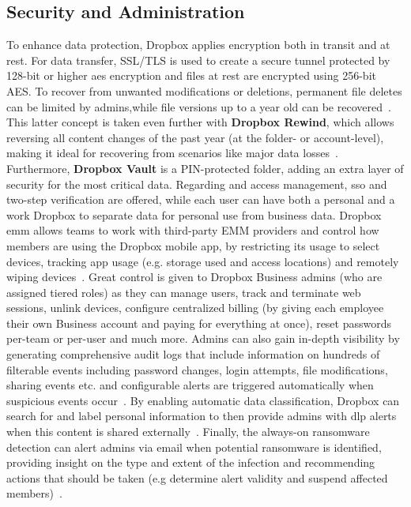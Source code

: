 \subsection{Security and Administration}
To enhance data protection, Dropbox applies encryption both in transit and at rest. For data transfer, SSL/TLS is used to create a secure tunnel protected by 128-bit or higher \ac{aes} encryption and files at rest are encrypted using 256-bit AES. To recover from unwanted modifications or deletions, permanent file deletes can be limited by admins,while file versions up to a year old can be recovered~\cite{dropbox_security}. This latter concept is taken even further with \textbf{Dropbox Rewind}, which allows reversing all content changes of the past year (at the folder- or account-level), making it ideal for recovering from scenarios like major data losses~\cite{dropbox_rewind}. Furthermore, \textbf{Dropbox Vault} is a PIN-protected folder, adding an extra layer of security for the most critical data. Regarding and access management, \ac{sso} and two-step verification are offered, while each user can have both a personal and a work Dropbox to separate data for personal use from business data. Dropbox \ac{emm} allows teams to work with third-party EMM providers and control how members are using the Dropbox mobile app, by restricting its usage to select devices, tracking app usage (e.g. storage used and access locations) and remotely wiping devices~\cite{dropbox_emm}. Great control is given to Dropbox Business admins (who are assigned tiered roles) as they can manage users, track and terminate web sessions, unlink devices, configure centralized billing (by giving each employee their own Business account and paying for everything at once), reset passwords per-team or per-user and much more.  Admins can also gain in-depth visibility by generating comprehensive audit logs that include information on hundreds of filterable events including password changes, login attempts, file modifications, sharing events etc. and configurable alerts are triggered automatically when suspicious events occur~\cite{dropbox_admin}. By enabling automatic data classification, Dropbox can search for and label personal information to then provide admins with \ac{dlp} alerts when this content is shared externally~\cite{dropbox_dlp}. Finally, the always-on ransomware detection can alert admins via email when potential ransomware is identified, providing insight on the type and extent of the infection and recommending actions that should be taken (e.g determine alert validity and suspend affected members)~\cite{dropbox_ransomware,dropbox}.

